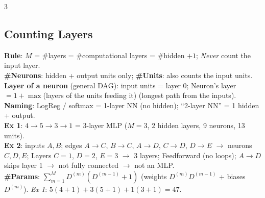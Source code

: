 \documentclass[10pt]{article}
\newcommand{\sub}[1]{\textit{#1}:}  %
\begin{document}
\begin{multicols*}{3}
\subsection{Counting Layers}
\textbf{Rule}: $M$ = \#layers = \#computational layers = \#hidden $+1$; \emph{Never} count the input layer.\\
\textbf{\#Neurons}: hidden + output units only; \textbf{\#Units}: also counts the input units.\\
\textbf{Layer of a neuron} (general DAG): input units = layer 0; Neuron's layer $=1+\max$(layers of the units feeding it) (longest path from the inputs).\\
\textbf{Naming}: LogReg / softmax = 1-layer NN (no hidden); ``2-layer NN'' = 1 hidden + output.\\
\textbf{Ex 1}: $4\to5\to3\to1$ = 3-layer MLP ($M=3$, 2 hidden layers, 9 neurons, 13 units).\\
\textbf{Ex 2}: inputs $A,B$; edges $A\!\to\!C$, $B\!\to\!C$, $A\!\to\!D$, $C\!\to\!D$, $D\!\to\!E$ $\to$ neurons $C,D,E$; Layers $C=1$, $D=2$, $E=3$ $\to$ 3 layers; Feedforward (no loops); $A\!\to\!D$ skips layer 1 $\to$ not fully connected $\to$ not an MLP.\\
\textbf{\#Params}: $\sum_{m=1}^M D^{(m)}(D^{(m-1)}+1)$ (weights $D^{(m)}D^{(m-1)}$ + biases $D^{(m)}$). \sub{Ex 1} $5(4\!+\!1)+3(5\!+\!1)+1(3\!+\!1)=47$.


\end{multicols*}
\end{document}
